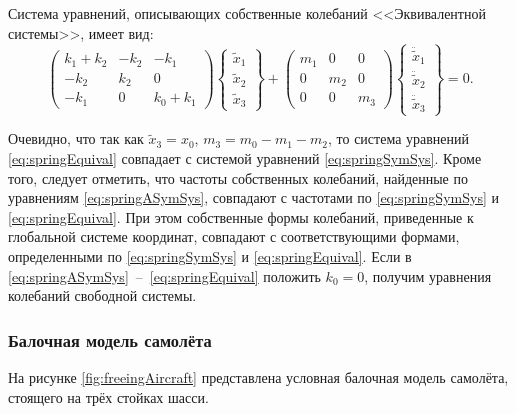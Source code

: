 Система уравнений, описывающих собственные колебаний <<Эквивалентной системы>>, имеет вид:
\begin{equation}
	\begin{pmatrix}
		k_1+k_2 & -k_2 & -k_1 \\
		-k_2 & k_2 & 0 \\
		-k_1 & 0 & k_0+k_1
	\end{pmatrix}
	\begin{Bmatrix}
		\tilde{x}_1 \\ \tilde{x}_2 \\ \tilde{x}_3
	\end{Bmatrix} +
	\begin{pmatrix}
		m_1 & 0 & 0 \\
		0 & m_2 & 0 \\
		0 & 0 & m_3
	\end{pmatrix}
	\begin{Bmatrix}
		\ddot{\tilde{x}}_1 \\ \ddot{\tilde{x}}_2 \\ \ddot{\tilde{x}}_3
	\end{Bmatrix} = 0.
	\label{eq:springEquival}
\end{equation}

Очевидно, что так как $ \tilde{x}_3 = x_0 $, $ m_3 = m_0 - m_1 - m_2$, то система уравнений \eqref{eq:springEquival} совпадает с системой уравнений \eqref{eq:springSymSys}. Кроме того, следует отметить, что частоты собственных колебаний, найденные по уравнениям \eqref{eq:springASymSys}, совпадают с частотами по \eqref{eq:springSymSys} и \eqref{eq:springEquival}. При этом собственные формы колебаний, приведенные к глобальной системе координат, совпадают с соответствующими формами, определенными по \eqref{eq:springSymSys} и \eqref{eq:springEquival}. Если в \eqref{eq:springASymSys}~--~\eqref{eq:springEquival} положить $ k_0 = 0$, получим уравнения колебаний свободной системы.

\subsubsection{Балочная модель самолёта}

На рисунке \ref{fig:freeingAircraft} представлена условная балочная модель самолёта, стоящего на трёх стойках шасси.

